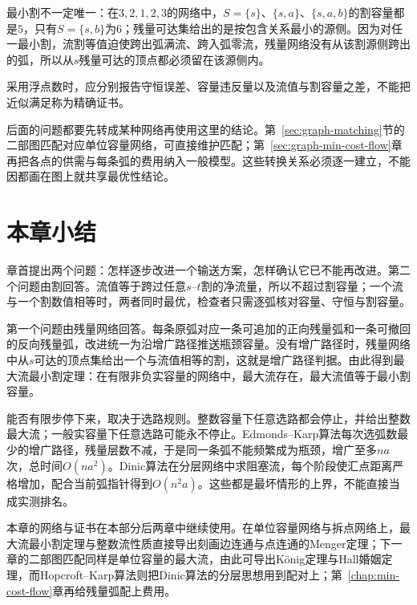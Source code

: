 最小割不一定唯一：在$3,2,1,2,3$的网络中，$S=\{s\}$、$\{s,a\}$、$\{s,a,b\}$的割容量都是$5$，只有$S=\{s,b\}$为$6$；残量可达集给出的是按包含关系最小的源侧。因为对任一最小割，流割等值迫使跨出弧满流、跨入弧零流，残量网络没有从该割源侧跨出的弧，所以从$s$残量可达的顶点都必须留在该源侧内。

采用浮点数时，应分别报告守恒误差、容量违反量以及流值与割容量之差，不能把近似满足称为精确证书。

后面的问题都要先转成某种网络再使用这里的结论。第~\ref{sec:graph-matching}节的二部图匹配对应单位容量网络，可直接维护匹配；第~\ref{sec:graph-min-cost-flow}章再把各点的供需与每条弧的费用纳入一般模型。这些转换关系必须逐一建立，不能因都画在图上就共享最优性结论。

\FloatBarrier
\section{本章小结}
\label{sec:max-flow-summary}

章首提出两个问题：怎样逐步改进一个输送方案，怎样确认它已不能再改进。第二个问题由割回答。流值等于跨过任意$s$--$t$割的净流量，所以不超过割容量；一个流与一个割数值相等时，两者同时最优，检查者只需逐弧核对容量、守恒与割容量。

第一个问题由残量网络回答。每条原弧对应一条可追加的正向残量弧和一条可撤回的反向残量弧，改进统一为沿增广路径推送瓶颈容量。没有增广路径时，残量网络中从$s$可达的顶点集给出一个与流值相等的割，这就是增广路径判据。由此得到最大流最小割定理：在有限非负实容量的网络中，最大流存在，最大流值等于最小割容量。

能否有限步停下来，取决于选路规则。整数容量下任意选路都会停止，并给出整数最大流；一般实容量下任意选路可能永不停止。Edmonds--Karp算法每次选弧数最少的增广路径，残量层数不减，于是同一条弧不能频繁成为瓶颈，增广至多$na$次，总时间$O(na^2)$。Dinic算法在分层网络中求阻塞流，每个阶段使汇点距离严格增加，配合当前弧指针得到$O(n^2a)$。这些都是最坏情形的上界，不能直接当成实测排名。

本章的网络与证书在本部分后两章中继续使用。在单位容量网络与拆点网络上，最大流最小割定理与整数流性质直接导出刻画边连通与点连通的Menger定理；下一章的二部图匹配同样是单位容量的最大流，由此可导出König定理与Hall婚姻定理，而Hopcroft--Karp算法则把Dinic算法的分层思想用到配对上；第~\ref{chap:min-cost-flow}章再给残量弧配上费用。
